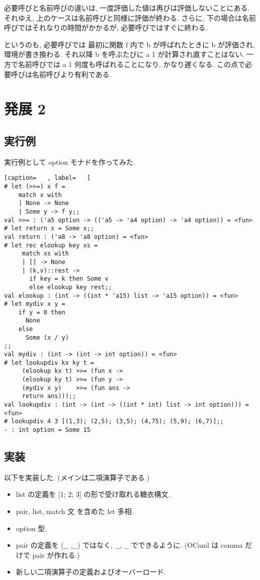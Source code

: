 \documentclass[dvipdfmx]{jsarticle}
\begin{document}
必要呼びと名前呼びの違いは,
一度評価した値は再びは評価しないことにある.
それゆえ, 上のケースは名前呼びと同様に評価が終わる.
さらに, 下の場合は名前呼びではそれなりの時間がかかるが,
必要呼びではすぐに終わる.

というのも, 必要呼びでは
最初に関数 f 内で b が呼ばれたときに b が評価され, 環境が書き換わる.
それ以降 b を呼ぶたびに a 1 が計算され直すことはない.
一方で名前呼びでは a 1 何度も呼ばれることになり, かなり遅くなる.
この点で必要呼びは名前呼びより有利である.





\newpage
\section*{発展 2}
\subsection*{実行例}
実行例として option モナドを作ってみた.
\begin{lstlisting}[caption=   , label=   ]
# let (>>=) x f =
    match x with
    | None -> None
    | Some y -> f y;;
val >>= : ('a5 option -> (('a5 -> 'a4 option) -> 'a4 option)) = <fun>
# let return x = Some x;;
val return : ('a8 -> 'a8 option) = <fun>
# let rec elookup key xs =
     match xs with
     | [] -> None
     | (k,v)::rest ->
       if key = k then Some v
       else elookup key rest;;
val elookup : (int -> ((int * 'a15) list -> 'a15 option)) = <fun>
# let mydiv x y =
    if y = 0 then
      None
    else
      Some (x / y)
;;
val mydiv : (int -> (int -> int option)) = <fun>
# let lookupdiv kx ky t =
     (elookup kx t) >>= (fun x ->
     (elookup ky t) >>= (fun y ->
     (mydiv x y)    >>= (fun ans ->
     return ans)));;
val lookupdiv : (int -> (int -> ((int * int) list -> int option))) = <fun>
# lookupdiv 4 3 [(1,3); (2,5); (3,5); (4,75); (5,9); (6,7)];;
- : int option = Some 15
\end{lstlisting}
\subsection*{実装}
以下を実装した.
(メインは二項演算子である.)
\begin{itemize}
    \item list の定義を [1; 2; 3] の形で受け取れる糖衣構文.
    \item pair, list, match 文 を含めた let 多相.
    \item option 型.
    \item pair の定義を ($\_\_$ ,$\_\_$) ではなく, $\_\_$, $\_\_$ でできるように. (OCaml は comma だけで pair が作れる.)
    \item 新しい二項演算子の定義およびオーバーロード.
\end{itemize}
\end{document}
